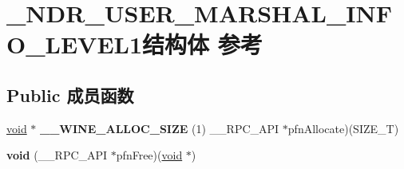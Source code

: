 \hypertarget{struct___n_d_r___u_s_e_r___m_a_r_s_h_a_l___i_n_f_o___l_e_v_e_l1}{}\section{\+\_\+\+N\+D\+R\+\_\+\+U\+S\+E\+R\+\_\+\+M\+A\+R\+S\+H\+A\+L\+\_\+\+I\+N\+F\+O\+\_\+\+L\+E\+V\+E\+L1结构体 参考}
\label{struct___n_d_r___u_s_e_r___m_a_r_s_h_a_l___i_n_f_o___l_e_v_e_l1}
\subsection*{Public 成员函数}
\begin{DoxyCompactItemize}
\item 
\mbox{\label{struct___n_d_r___u_s_e_r___m_a_r_s_h_a_l___i_n_f_o___l_e_v_e_l1_a11d44ec7a20024cc562d2b700fc77a1c}} 
\hyperlink{interfacevoid}{void} $\ast$ {\bfseries \+\_\+\+\_\+\+W\+I\+N\+E\+\_\+\+A\+L\+L\+O\+C\+\_\+\+S\+I\+ZE} (1) \+\_\+\+\_\+\+R\+P\+C\+\_\+\+A\+PI $\ast$pfn\+Allocate)(S\+I\+Z\+E\+\_\+T)
\item 
\mbox{\label{struct___n_d_r___u_s_e_r___m_a_r_s_h_a_l___i_n_f_o___l_e_v_e_l1_a6c85edb8dfb80ce46d738b21d17a2d7c}} 
{\bfseries void} (\+\_\+\+\_\+\+R\+P\+C\+\_\+\+A\+PI $\ast$pfn\+Free)(\hyperlink{interfacevoid}{void} $\ast$)
\end{DoxyCompactItemize}
